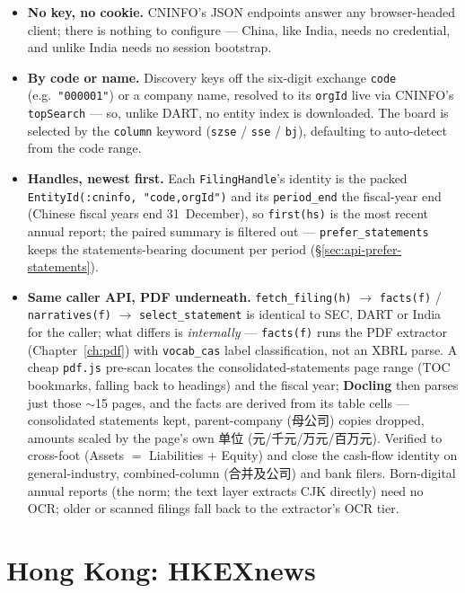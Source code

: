 \documentclass[11pt,a4paper]{report}
\begin{document}
\begin{itemize}
  \item \textbf{No key, no cookie.} CNINFO's JSON endpoints answer any browser-headed client; there is nothing
    to configure --- China, like India, needs no credential, and unlike India needs no session bootstrap.
  \item \textbf{By code or name.} Discovery keys off the six-digit exchange \texttt{code}
    (e.g.\ \texttt{"000001"}) or a company name, resolved to its \texttt{orgId} live via CNINFO's
    \texttt{topSearch} --- so, unlike DART, no entity index is downloaded. The board is selected by the
    \texttt{column} keyword (\texttt{szse} / \texttt{sse} / \texttt{bj}), defaulting to auto-detect from the
    code range.
  \item \textbf{Handles, newest first.} Each \texttt{FilingHandle}'s identity is the packed
    \texttt{EntityId(:cninfo,\ "code,orgId")} and its \texttt{period\_end} the fiscal-year end (Chinese fiscal
    years end 31~December), so \texttt{first(hs)} is the most recent annual report; the paired summary
    is filtered out --- \texttt{prefer\_statements} keeps the statements-bearing document per period
    (\S\ref{sec:api-prefer-statements}).
  \item \textbf{Same caller API, PDF underneath.} \texttt{fetch\_filing(h)} $\to$ \texttt{facts(f)} /
    \texttt{narratives(f)} $\to$ \texttt{select\_statement} is identical to SEC, DART or India for the caller;
    what differs is \emph{internally} --- \texttt{facts(f)} runs the PDF extractor (Chapter~\ref{ch:pdf}) with
    \texttt{vocab\_cas} label classification, not an XBRL parse. A cheap \texttt{pdf.js} pre-scan locates the
    consolidated-statements page range (TOC bookmarks, falling back to headings) and the fiscal year;
    \textbf{Docling} then parses just those \(\sim\)15 pages, and the facts are derived from its table cells
    --- consolidated statements kept, parent-company (母公司) copies dropped, amounts scaled by the page's own
    单位 (元/千元/万元/百万元). Verified to cross-foot (Assets $=$ Liabilities $+$ Equity) and close the
    cash-flow identity on general-industry, combined-column (合并及公司) and bank filers. Born-digital annual
    reports (the norm; the text layer extracts CJK directly) need no OCR; older or scanned filings fall back
    to the extractor's OCR tier.
\end{itemize}

\chapter{Hong Kong: HKEXnews}
\label{sys:hongkong}
\end{document}
